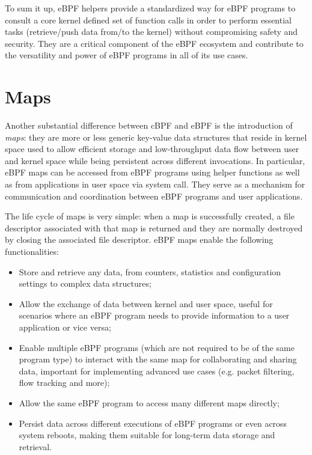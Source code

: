 To sum it up, eBPF helpers provide a standardized way for eBPF programs to consult a core kernel defined set of function calls in order to perform essential tasks (retrieve/push data from/to the kernel) without compromising safety and security. 
They are a critical component of the eBPF ecosystem and contribute to the versatility and power of eBPF programs in all of its use cases.

\section{Maps}

Another substantial difference between cBPF and eBPF is the introduction of \textit{maps}: they are more or less generic key-value data structures that reside in kernel space used to 
allow efficient storage and low-throughput data flow between user and kernel space while being persistent across different invocations.
In particular, eBPF maps can be accessed from eBPF programs using helper functions as well as from applications in user space via system call.
They serve as a mechanism for communication and coordination between eBPF programs and user applications.

The life cycle of maps is very simple: when a map is successfully created, a file descriptor associated with that map is returned and they are normally destroyed by closing the associated file descriptor.
eBPF maps enable the following functionalities:

\begin{itemize}
	\item 
		Store and retrieve any data, from counters, statistics and configuration settings to complex data structures;
	\item 
		Allow the exchange of data between kernel and user space, useful for scenarios where an eBPF program needs to provide information to a user application or vice versa;
	\item 
		Enable multiple eBPF programs (which are not required to be of the same program type) to interact with the same map for collaborating and sharing data, important for implementing advanced use cases (e.g. packet filtering, flow tracking and more); 
	\item 
		Allow the same eBPF program to access many different maps directly;
	\item 
		Persist data across different executions of eBPF programs or even across system reboots, making them suitable for long-term data storage and retrieval.
\end{itemize}

